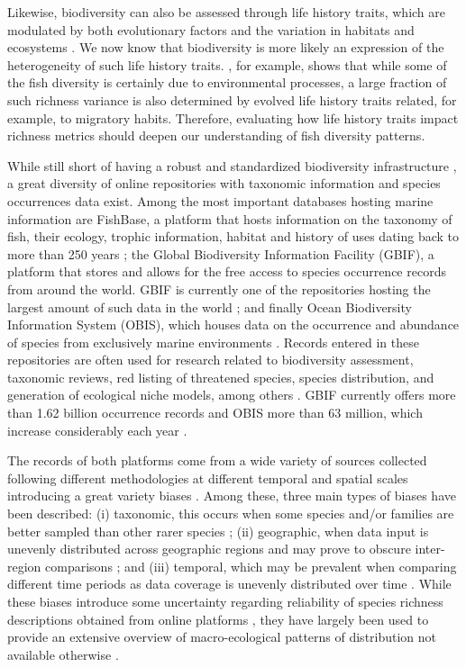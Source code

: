 \documentclass[12pt,authoryear]{elsarticle}
\begin{document}
Likewise, biodiversity can also be assessed through life history traits, which are modulated by both evolutionary factors and the variation in habitats and ecosystems \citep{neigel_book_1997, hutchings2005measuring}. We now know that biodiversity is more likely an expression of the heterogeneity of such life history traits. \citealt{alo2021macroecology}, for example, shows that while some of the fish diversity is certainly due to environmental processes, a large fraction of such richness variance is also determined by evolved life history traits related, for example, to migratory habits. Therefore, evaluating how life history traits impact richness metrics should deepen our understanding of fish diversity patterns.

While still short of having a robust and standardized biodiversity infrastructure \citep{heberling_data_2021}, a great diversity of online repositories with taxonomic information and species occurrences data exist. Among the most important databases hosting marine information are FishBase, a platform that hosts information on the taxonomy of fish, their ecology, trophic information, habitat and history of uses dating back to more than 250 years \citep{froese2000fishbase}; the Global Biodiversity Information Facility (GBIF), a platform that stores and allows for the free access to species occurrence records from around the world. GBIF is currently one of the repositories hosting the largest amount of such data in the world \citep{telenius2011, gbif}; and finally Ocean Biodiversity Information System (OBIS), which houses data on the occurrence and abundance of species from exclusively marine environments \citep{obis}. Records entered in these repositories are often used for research related to biodiversity assessment, taxonomic reviews, red listing of threatened species, species distribution, and generation of ecological niche models, among others \citep{yesson2007}. GBIF currently offers more than 1.62 billion occurrence records and OBIS more than 63 million, which increase considerably each year \citep{gbif, obis}.

The records of both platforms come from a wide variety of sources collected following different methodologies at different temporal and spatial scales introducing a great variety  biases \citep{beck2014, zizka2020}. Among these, three main types of biases have been described: (i) taxonomic, this occurs when some species and/or families are better sampled than other rarer species \citep{chandler2017}; (ii) geographic, when data input is unevenly distributed across geographic regions and may prove to obscure inter-region comparisons \citep{yang2013geographical, yesson2007}; and (iii) temporal, which may be prevalent when comparing different time periods as data coverage is unevenly distributed over time \citep{chandler2017, yang2013geographical}. While these biases introduce some uncertainty regarding reliability of species richness descriptions obtained from online platforms \citep{beck2014, garcia2015}, they have largely been used to provide an extensive overview of macro-ecological patterns of distribution not available otherwise \citep{mora2008completeness,troia2017}. 
\end{document}

